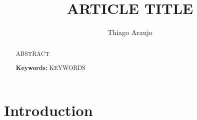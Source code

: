 \documentclass[a4paper,11pt]{amsart}
\begin{document}


\title[ARTICLE TITLE]{ARTICLE TITLE}

\author{Thiago Araujo}

\address{\noindent AFFILIATION}


\begin{abstract}
ABSTRACT 

\bigskip

\noindent \textbf{Keywords:} KEYWORDS  
\end{abstract}

\maketitle

\setcounter{tocdepth}{1}
\tableofcontents






\section{Introduction}









\end{document}
